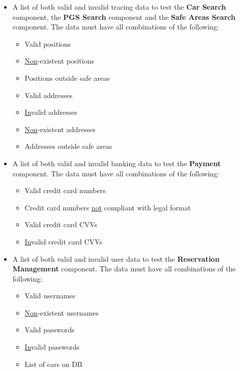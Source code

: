 \documentclass[english]{article}
\begin{document}
\begin{itemize}
     \item{A list of both valid and invalid tracing data to test the \textbf{Car Search} component, the \textbf{PGS Search} component and the \textbf{Safe Areas Search} component.
   The data must have all combinations of the following:
     \begin{itemize}
       \item{Valid positions}
       \item{\underline{Non}-existent positions}
       \item{Positions outside safe areas}
       \item{Valid addresses}
       \item{\underline{In}valid addresses}
       \item{\underline{Non}-existent addresses}
       \item{Addresses outside safe areas}
     \end{itemize}}
 
     \item{A list of both valid and invalid banking data to test the \textbf{Payment} component.
   The data must have all combinations of the following:
     \begin{itemize}
       \item{Valid credit card numbers}
       \item{Credit card numbers \underline{not} compliant with legal format}
       \item{Valid credit card CVVs}
       \item{\underline{In}valid credit card CVVs}
     \end{itemize}}
 
     \item{A list of both valid and invalid user data to test the \textbf{Reservation Management} component.
   The data must have all combinations of the following:
     \begin{itemize}
       \item{Valid usernames}
       \item{\underline{Non}-existent usernames}
       \item{Valid passwords}
       \item{\underline{In}valid passwords}
       \item{List of cars on DB}
     \end{itemize}}
 

\end{itemize}
\end{document}
